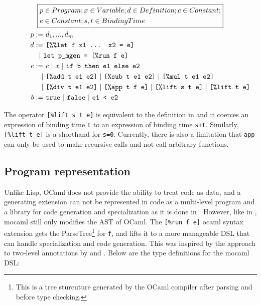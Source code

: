 \begin{gather*}  
  \boxed{    
    \begin{aligned}
      &p\in Program; x\in Variable; d\in Definition; c\in Constant;\\
      &e \in Constant; s,t \in BindingTime
    \end{aligned}
  }\\
  \hspace{1cm}
  \begin{align*}
    p :=&~d_1,...,d_m\\
    d :=&~\text{\texttt{[\%\%let f x1 ... x2 = e]}}\\
    |~& \text{\texttt{let p\_mgen = [\%run f e]}}\\
    e :=&~c ~|~x ~|~\text{\texttt{if b then e1 else e2}}\\
    |&~\text{\texttt{[\%add t e1 e2]}}
       ~|~\text{\texttt{[\%sub t e1 e2]}}
       ~|~\text{\texttt{[\%mul t e1 e2]}}\\
    |&~\text{\texttt{[\%div t e1 e2]}}
       ~|~\text{\texttt{[\%app t f e]}}
       ~|~\text{\texttt{[\%lift s t e]}}
       ~|~\text{\texttt{[\%lift t e]}}\\
    b :=&~\mathtt{true} ~|~\mathtt{false} ~|~\text{\texttt{e1 < e2}}
  \end{align*}
\end{gather*}

The operator \texttt{[\%lift s t e]} is equivalent to the definition in \cite{multilevel} and it coerces an expression of binding time \texttt{t} to an expression of binding time \texttt{s+t}. Similarly, \texttt{[\%lift t e]} is a shorthand for \texttt{s=0}. Currently, there is also a limitation that \texttt{app} can only be used to make recursive calls and not call arbitrary functions.

\subsection{Program representation}

Unlike Lisp, OCaml does not provide the ability to treat code as data, and a generating extension can not be represented in code as a multi-level program and a library for code generation and specialization as it is done in \cite{multilevel}. However, like in \cite{multilevel}, mocaml still only modifies the AST of OCaml.
The \texttt{[\%run f e]} ocaml syntax extension gets the ParseTree\footnote{This is a tree sturcuture generated by the OCaml compiler after parsing and before type checking.} for \texttt{f}, and lifts it to a more manageable DSL that can handle specialization and code generation. This was inspired by the approach to two-level annotations by \cite{metaML} and \cite{metaOCaml}. Below are the type definitions for the mocaml DSL:

